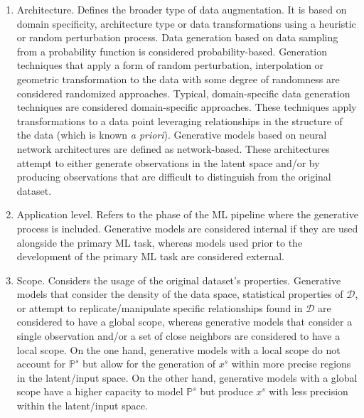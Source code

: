 \begin{enumerate}

    \item Architecture. Defines the broader type of data augmentation. It is
        based on domain specificity, architecture type or data transformations
        using a heuristic or random perturbation process. Data generation
        based on data sampling from a probability function is considered
        probability-based. Generation techniques that apply a form of random
        perturbation, interpolation or geometric transformation to the data
        with some degree of randomness are considered randomized approaches.
        Typical, domain-specific data generation techniques are considered
        domain-specific approaches. These techniques apply transformations to
        a data point leveraging relationships in the structure of the data
        (which is known \textit{a priori}). Generative models based on neural
        network architectures are defined as network-based. These
        architectures attempt to either generate observations in the latent
        space and/or by producing observations that are difficult to
        distinguish from the original dataset.

    \item Application level. Refers to the phase of the ML pipeline where the
        generative process is included. Generative models are considered
        internal if they are used alongside the primary ML task, whereas
        models used prior to the development of the primary ML task are
        considered external.

    \item Scope. Considers the usage of the original dataset's properties.
        Generative models that consider the density of the data space,
        statistical properties of $\mathcal{D}$, or attempt to
        replicate/manipulate specific relationships found in $\mathcal{D}$ are
        considered to have a global scope, whereas generative models that
        consider a single observation and/or a set of close neighbors are
        considered to have a local scope. On the one hand, generative models
        with a local scope do not account for $\mathbb{P}^s$ but allow for the
        generation of $x^s$ within more precise regions in the
        latent/input space. On the other hand, generative models with a
        global scope have a higher capacity to model $\mathbb{P}^s$ but
        produce $x^s$ with less precision within the latent/input
        space.


\end{enumerate}
